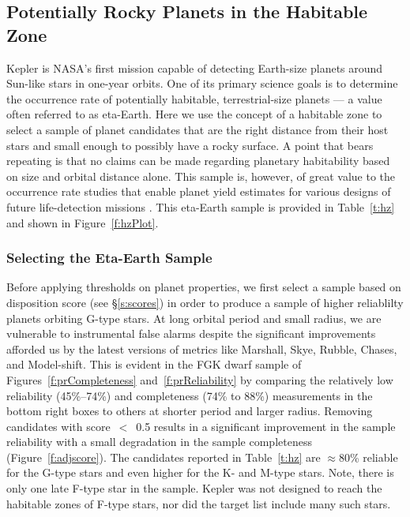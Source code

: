 
\subsection{Potentially Rocky Planets in the Habitable Zone}
\label{s:hz}
Kepler is NASA's first mission capable of detecting Earth-size planets around Sun-like stars in one-year orbits.  One of its primary science goals is to determine the occurrence rate of potentially habitable, terrestrial-size planets --- a value often referred to as eta-Earth.  Here we use the concept of a habitable zone to select a sample of planet candidates that are the right distance from their host stars and small enough to possibly have a rocky surface. A point that bears repeating is that no claims can be made regarding planetary habitability based on size and orbital distance alone.   This sample is, however, of great value to the occurrence rate studies that enable planet yield estimates for various designs of future life-detection missions \citep{stark2015}. This eta-Earth sample is provided in Table~\ref{t:hz} and shown in Figure~\ref{f:hzPlot}.

\subsubsection{Selecting the Eta-Earth Sample}

Before applying thresholds on planet properties, we first select a sample based on disposition score (see \S\ref{s:scores}) in order to produce a sample of higher reliablilty planets orbiting G-type stars. At long orbital period and small radius, we are vulnerable to instrumental false alarms despite the significant improvements afforded us by the latest versions of metrics like Marshall, Skye, Rubble, Chases, and Model-shift. This is evident in the FGK dwarf sample of Figures~\ref{f:prCompleteness} and~\ref{f:prReliability} by comparing the relatively low reliability (45\%--74\%) and completeness (74\% to 88\%) measurements in the bottom right boxes to others at shorter period and larger radius.  Removing candidates with score~$<$~0.5 results in a significant improvement in the sample reliability with a small degradation in the sample completeness (Figure~\ref{f:adjscore}).  The candidates reported in Table~\ref{t:hz} are $\approx$80\% reliable for the G-type stars and even higher for the K- and M-type stars. Note, there is only one late F-type star in the sample.  Kepler was not designed to reach the habitable zones of F-type stars, nor did the target list include many such stars.


